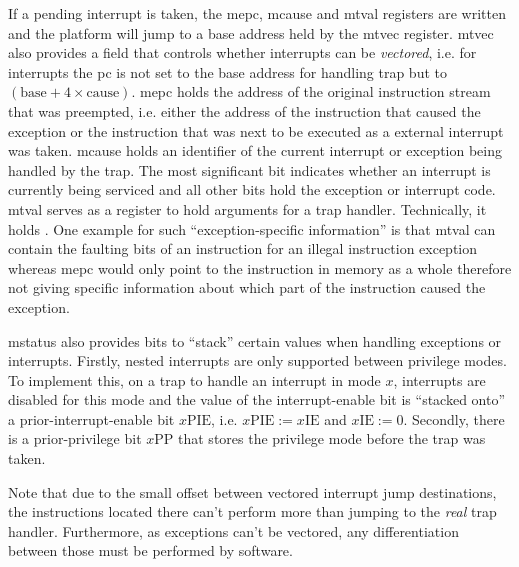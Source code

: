 If a pending interrupt is taken, the \gls{mepc}, \gls{mcause} and \gls{mtval} registers are written and the platform will jump to a base address held by the \gls{mtvec} register.
\gls{mtvec} also provides a field that controls whether interrupts can be \textit{vectored}, i.e. for interrupts the \gls{pc} is not set to the base address for handling trap but to $ (\text{base} + 4 \times \text{cause}) $.
\gls{mepc} holds the address of the original instruction stream that was preempted, i.e. either the address of the instruction that caused the exception or the instruction that was next to be executed as a external interrupt was taken.
\gls{mcause} holds an identifier of the current interrupt or exception being handled by the trap.
The most significant bit indicates whether an interrupt is currently being serviced and all other bits hold the exception or interrupt code.
\gls{mtval} serves as a register to hold arguments for a trap handler.
Technically, it holds .
One example for such \enquote{exception-specific information} is that \gls{mtval} can contain the faulting bits of an instruction for an illegal instruction exception whereas \gls{mepc} would only point to the instruction in memory as a whole therefore not giving specific information about which part of the instruction caused the exception.

\gls{mstatus} also provides bits to \enquote{stack} certain values when handling exceptions or interrupts.
Firstly, nested interrupts are only supported between privilege modes.
To implement this, on a trap to handle an interrupt in mode $ x $, interrupts are disabled for this mode and the value of the interrupt-enable bit is \enquote{stacked onto} a prior-interrupt-enable bit $x\text{PIE} $, i.e. $ x\text{PIE} := x\text{IE} $ and $ x\text{IE} := 0 $.
Secondly, there is a prior-privilege bit $ x\text{PP} $ that stores the privilege mode before the trap was taken.

Note that due to the small offset between vectored interrupt jump destinations, the instructions located there can't perform more than jumping to the \textit{real} trap handler.
Furthermore, as exceptions can't be vectored, any differentiation between those must be performed by software.


